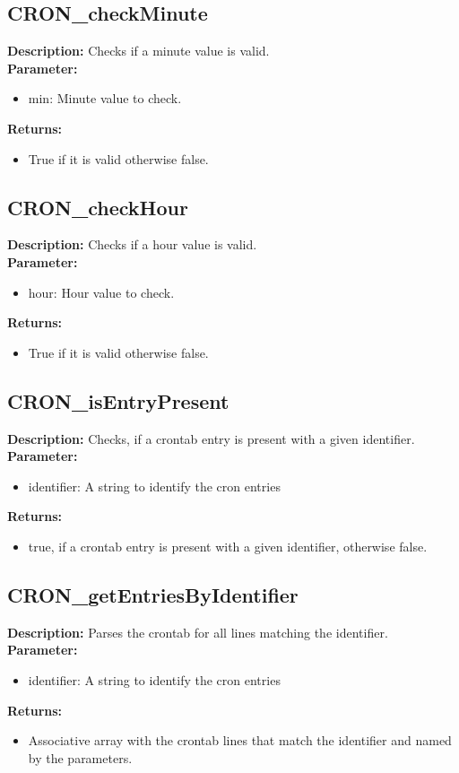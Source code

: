 \subsection{CRON\_checkMinute}
\textbf{Description:} Checks if a minute value is valid.\\
\textbf{Parameter:}
\begin{itemize}
\item min: Minute value to check.
\end{itemize}
\textbf{Returns:}
\begin{itemize}
\item True if it is valid otherwise false.
\end{itemize}

\subsection{CRON\_checkHour}
\textbf{Description:} Checks if a hour value is valid.\\
\textbf{Parameter:}
\begin{itemize}
\item hour: Hour value to check.
\end{itemize}
\textbf{Returns:}
\begin{itemize}
\item True if it is valid otherwise false.
\end{itemize}

\subsection{CRON\_isEntryPresent}
\textbf{Description:} Checks, if a crontab entry is present with a given identifier.\\
\textbf{Parameter:}
\begin{itemize}
\item identifier: A string to identify the cron entries
\end{itemize}
\textbf{Returns:}
\begin{itemize}
\item true, if a crontab entry is present with a given identifier, otherwise false.
\end{itemize}

\subsection{CRON\_getEntriesByIdentifier}
\textbf{Description:} Parses the crontab for all lines matching the identifier.\\
\textbf{Parameter:}
\begin{itemize}
\item identifier: A string to identify the cron entries
\end{itemize}
\textbf{Returns:}
\begin{itemize}
\item Associative array with the crontab lines that match the identifier and named by the parameters.
\end{itemize}

